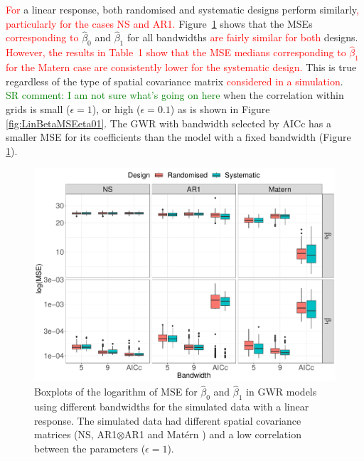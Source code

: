 \documentclass[a4paper]{article} 	%
\newcommand{\Matern}{Mat\'ern }
\newcommand{\revision}[1]{\textcolor{red}{#1}}
\begin{document}
\revision{For} a linear response, both randomised and systematic designs perform similarly\revision{, particularly for the cases NS and AR1.} Figure~\ref{fig:LinBetaMSE} shows that the MSEs \revision{corresponding to} $\hat{\beta}_0$ and $\hat{\beta}_1$ for all bandwidths \revision{are fairly similar for both} designs. \revision{However, the results in Table~1 show that the MSE medians corresponding to $\hat{\beta}_1$ for the Matern case are consistently lower for the systematic design.} This is true regardless of the type of spatial covariance matrix \revision{considered in a simulation}. \\
\textcolor{green}{SR comment: I am not sure what's going on here}
when the correlation within grids is small ($\epsilon=1$), or high ($\epsilon=0.1$) as is shown in Figure \ref{fig:LinBetaMSEeta01}. The GWR with bandwidth selected by AICc has a smaller MSE for its coefficients than the model with a fixed bandwidth (Figure \ref{fig:LinBetaMSE}). 


\begin{figure}[!htp]
	\centering
	\includegraphics[width=\linewidth]{Expt/Col_LinCombMSE_newpar.pdf}
	\caption{Boxplots of the logarithm of MSE for $\hat{\beta}_0$ and $\hat{\beta}_1$ in GWR models using different bandwidths for the simulated data with a linear response. The simulated data had different spatial covariance matrices (NS, AR1$\otimes$AR1 and \Matern) and a low correlation between the parameters ($\epsilon=1$).}\label{fig:LinBetaMSE}
\end{figure}
\end{document}
